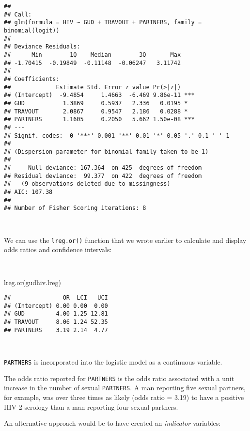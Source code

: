 \documentclass[
  12pt,
  a4paper]{book}
\newenvironment{Shaded}{\begin{snugshade}}{\end{snugshade}}
\newcommand{\FunctionTok}[1]{\textcolor[rgb]{0.00,0.00,0.00}{#1}}
\newcommand{\NormalTok}[1]{#1}
\begin{document}
\begin{verbatim}
## 
## Call:
## glm(formula = HIV ~ GUD + TRAVOUT + PARTNERS, family = binomial(logit))
## 
## Deviance Residuals: 
##      Min        1Q    Median        3Q       Max  
## -1.70415  -0.19849  -0.11148  -0.06247   3.11742  
## 
## Coefficients:
##             Estimate Std. Error z value Pr(>|z|)    
## (Intercept)  -9.4854     1.4663  -6.469 9.86e-11 ***
## GUD           1.3869     0.5937   2.336   0.0195 *  
## TRAVOUT       2.0867     0.9547   2.186   0.0288 *  
## PARTNERS      1.1605     0.2050   5.662 1.50e-08 ***
## ---
## Signif. codes:  0 '***' 0.001 '**' 0.01 '*' 0.05 '.' 0.1 ' ' 1
## 
## (Dispersion parameter for binomial family taken to be 1)
## 
##     Null deviance: 167.364  on 425  degrees of freedom
## Residual deviance:  99.377  on 422  degrees of freedom
##   (9 observations deleted due to missingness)
## AIC: 107.38
## 
## Number of Fisher Scoring iterations: 8
\end{verbatim}

~

We can use the \texttt{lreg.or()} function that we wrote earlier to calculate and display odds ratios and confidence intervals:

~

\begin{Shaded}
\begin{Highlighting}[]
\FunctionTok{lreg.or}\NormalTok{(gudhiv.lreg)}
\end{Highlighting}
\end{Shaded}

\begin{verbatim}
##               OR  LCI   UCI
## (Intercept) 0.00 0.00  0.00
## GUD         4.00 1.25 12.81
## TRAVOUT     8.06 1.24 52.35
## PARTNERS    3.19 2.14  4.77
\end{verbatim}

~

\texttt{PARTNERS} is incorporated into the logistic model as a continuous variable.

The odds ratio reported for \texttt{PARTNERS} is the odds ratio associated with a unit increase in the number of sexual \texttt{PARTNERS}. A man reporting five sexual partners, for example, was over three times as likely (odds ratio = 3.19) to have a positive HIV-2 serology than a man reporting four sexual partners.

An alternative approach would be to have created an \emph{indicator} variables:

~
\end{document}
